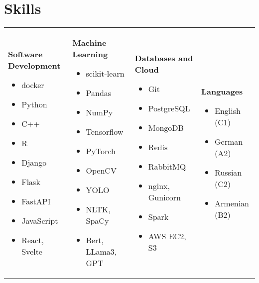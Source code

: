 \documentclass{ExpressiveResume}
\begin{document}
\section{Skills}
\noindent\begin{tabularx}{\textwidth}{@{}X@{}X@{}X@{}X@{}}
\textbf{Software Development}
\begin{itemize}
    \item docker
    \item Python
    \item C++
    \item R
    \item Django
    \item Flask
    \item FastAPI
    \item JavaScript
    \item React, Svelte
\end{itemize}
&
\textbf{Machine Learning}
\begin{itemize}
    \item scikit-learn
    \item Pandas
    \item NumPy
    \item Tensorflow
    \item PyTorch
    \item OpenCV
    \item YOLO
    \item NLTK, SpaCy
    \item Bert, LLama3, GPT
\end{itemize}
&
\textbf{Databases and Cloud}
\begin{itemize}
    \item Git
    \item PostgreSQL
    \item MongoDB
    \item Redis
    \item RabbitMQ
    \item nginx, Gunicorn
    \item Spark
    \item AWS EC2, S3
\end{itemize}
&
\textbf{Languages}
\begin{itemize}
    \item English (C1)
    \item German (A2)
    \item Russian (C2)
    \item Armenian (B2)
\end{itemize}
\end{tabularx}
\end{document}
